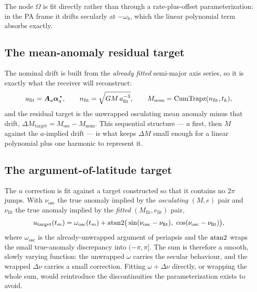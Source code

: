 The node $\Omega$ is fit directly rather than through a rate-plus-offset
parameterization: in the PA frame it drifts secularly at $-\omega_b$, which the
linear polynomial term absorbs exactly.

\subsection{The mean-anomaly residual target}

The nominal drift is built from the \emph{already fitted} semi-major axis
series, so it is exactly what the receiver will reconstruct:
\begin{equation}
  \label{eq:eph-alm-mnom}
  a_\mathrm{fit} = \bm{A}_a\bm{\alpha}_a^{\,\star},
  \qquad
  n_\mathrm{fit} = \sqrt{GM\,a_\mathrm{fit}^{-3}},
  \qquad
  M_\mathrm{nom} = \operatorname{CumTrapz}(n_\mathrm{fit}, t_k),
\end{equation}
and the residual target is the unwrapped osculating mean anomaly minus that
drift, $\Delta M_\mathrm{target} = M_\mathrm{osc} - M_\mathrm{nom}$. This
sequential structure --- $a$ first, then $M$ against the $a$-implied drift ---
is what keeps $\Delta M$ small enough for a linear polynomial plus one
harmonic to represent it.

\subsection{The argument-of-latitude target}

The $u$ correction is fit against a target constructed so that it contains no
$2\pi$ jumps. With $\nu_\mathrm{osc}$ the true anomaly implied by the
\emph{osculating} $(M, e)$ pair and $\nu_\mathrm{fit}$ the true anomaly implied
by the \emph{fitted} $(M_\mathrm{fit}, e_\mathrm{fit})$ pair,
\begin{equation}
  \label{eq:eph-alm-utarget}
  u_\mathrm{target}(t_m)
  = \omega_\mathrm{osc}(t_m)
    + \operatorname{atan2}\!\big(\sin(\nu_\mathrm{osc} - \nu_\mathrm{fit}),\
                     \cos(\nu_\mathrm{osc} - \nu_\mathrm{fit})\big),
\end{equation}
where $\omega_\mathrm{osc}$ is the already-unwrapped argument of periapsis and
the $\operatorname{atan2}$ wraps the small true-anomaly discrepancy into $(-\pi, \pi]$.
The sum is therefore a smooth, slowly varying function: the unwrapped
$\omega$ carries the secular behaviour, and the wrapped $\Delta\nu$ carries a
small correction. Fitting $\omega + \Delta\nu$ directly, or wrapping the whole
sum, would reintroduce the discontinuities the parameterization exists to
avoid.

